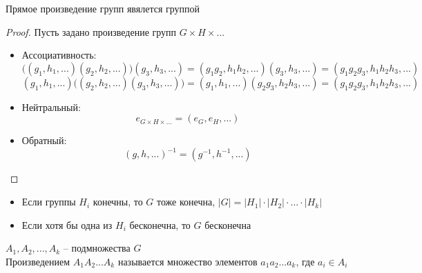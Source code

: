 \begin{theorem}
	Прямое произведение групп явялется группой
\end{theorem}

\begin{proof}
	Пусть задано произведение групп $ G \times H \times ... $
	\begin{itemize}
		\item Ассоциативность:
		$$ \bigg( (g_1, h_1, ...)(g_2, h_2, ...) \bigg) (g_3, h_3, ...) = (g_1g_2, h_1h_2, ...)(g_3, h_3, ...) = (g_1g_2g_3, h_1h_2h_3, ...) $$
		$$ (g_1, h_1, ...) \bigg( (g_2, h_2, ...)(g_3, h_3, ...) \bigg) = (g_1, h_1, ...)(g_2g_3, h_2h_3, ...) = (g_1g_2g_3, h_1h_2h_3, ...) $$
		\item Нейтральный:
		$$ e_{G \times H \times ...} = (e_G, e_H, ...) $$
		\item Обратный:
		$$ (g, h, ...)^{-1} = (g^{-1}, h^{-1}, ...) $$
	\end{itemize}
\end{proof}

\begin{property}
	\hfill
	\begin{itemize}
		\item Если группы $ H_i $ конечны, то $ G $ тоже конечна, $ |G| = |H_1| \cdot |H_2| \cdot ... \cdot |H_k| $
		\item Если хотя бы одна из $ H_i $ бесконечна, то $ G $ бесконечна
	\end{itemize}
\end{property}

\begin{remind}
	$ A_1, A_2, ..., A_k $ -- подмножества $ G $ \\
	Произведением $ A_1A_2...A_k $ называется множество элементов $ a_1a_2...a_k $, где $ a_i \in A_i $
\end{remind}

